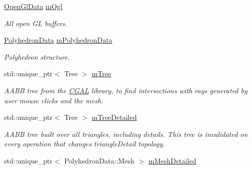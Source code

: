 \begin{DoxyCompactItemize}
\mbox{\label{classpepr3d_1_1_geometry_addf4b4de09e100d6e4279d21e01a05eb}} 
\mbox{\hyperlink{structpepr3d_1_1_geometry_1_1_open_gl_data}{Open\+Gl\+Data}} \mbox{\hyperlink{classpepr3d_1_1_geometry_addf4b4de09e100d6e4279d21e01a05eb}{m\+Ogl}}
\begin{DoxyCompactList}\small\item\em All open GL buffers. \end{DoxyCompactList}\item 
\mbox{\label{classpepr3d_1_1_geometry_a040e500c0481caafb88141d8e42128bb}} 
\mbox{\hyperlink{structpepr3d_1_1_polyhedron_data}{Polyhedron\+Data}} \mbox{\hyperlink{classpepr3d_1_1_geometry_a040e500c0481caafb88141d8e42128bb}{m\+Polyhedron\+Data}}
\begin{DoxyCompactList}\small\item\em Polyhedron structure. \end{DoxyCompactList}\item 
\mbox{\label{classpepr3d_1_1_geometry_ab9f70b2e8bbd7a9baa001b981c6215aa}} 
std\+::unique\+\_\+ptr$<$ Tree $>$ \mbox{\hyperlink{classpepr3d_1_1_geometry_ab9f70b2e8bbd7a9baa001b981c6215aa}{m\+Tree}}
\begin{DoxyCompactList}\small\item\em A\+A\+BB tree from the \mbox{\hyperlink{namespace_c_g_a_l}{C\+G\+AL}} library, to find intersections with rays generated by user mouse clicks and the mesh. \end{DoxyCompactList}\item 
\mbox{\label{classpepr3d_1_1_geometry_a1108d0993ef23fb246ae10244a0c2240}} 
std\+::unique\+\_\+ptr$<$ Tree $>$ \mbox{\hyperlink{classpepr3d_1_1_geometry_a1108d0993ef23fb246ae10244a0c2240}{m\+Tree\+Detailed}}
\begin{DoxyCompactList}\small\item\em A\+A\+BB tree built over all triangles, including details. This tree is invalidated on every operation that changes triangle\+Detail topology. \end{DoxyCompactList}\item 
\mbox{\label{classpepr3d_1_1_geometry_a73e2b6c74082b59b5d99d58e018e5bff}} 
std\+::unique\+\_\+ptr$<$ Polyhedron\+Data\+::\+Mesh $>$ \mbox{\hyperlink{classpepr3d_1_1_geometry_a73e2b6c74082b59b5d99d58e018e5bff}{m\+Mesh\+Detailed}}

\end{DoxyCompactItemize}
